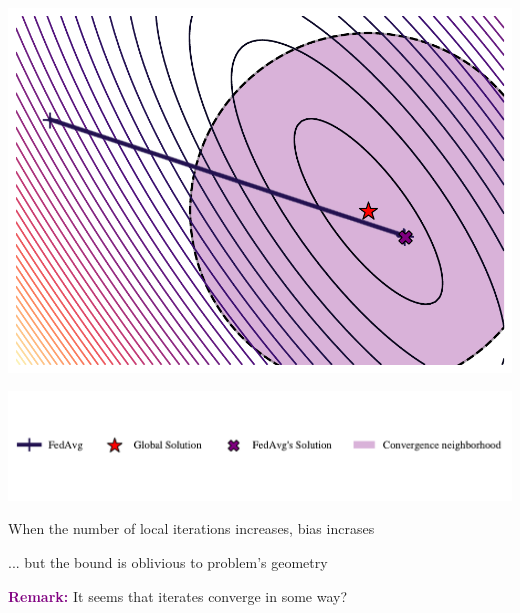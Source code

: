 \documentclass[aspectratio=169,12pt]{beamer}
\begin{document}
\begin{frame}[t]
\begin{center}
{  \includegraphics[width=0.3\linewidth]{images/plots/fedavg_True_50_t1000_s0.pdf}
}%

\vspace{-3em}

\includegraphics[width=0.8\linewidth]{images/legend_fedavg.pdf}    
    
  \end{center}

  \vspace{-3em}

  \begin{center}
    When the number of local iterations increases, bias incrases

    \pause
    
    ... but the bound is oblivious to problem's geometry
    

  \pause
  
  \textcolor{purple}{\bfseries Remark:} It seems that iterates converge in some way?
  \end{center}
  
\end{frame}
\end{document}
